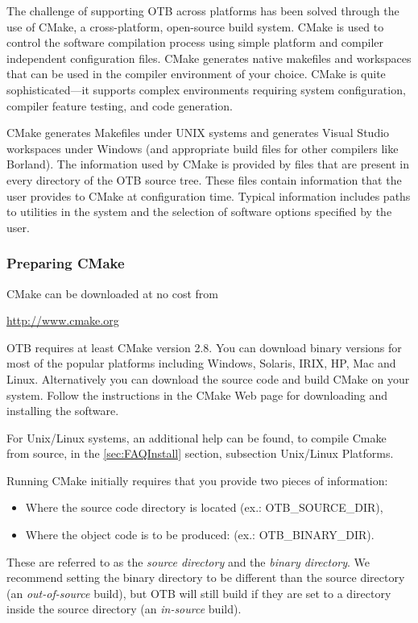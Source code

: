 
The challenge of supporting OTB across platforms has been solved through the
use of CMake, a cross-platform, open-source build system. CMake is used to
control the software compilation process using simple platform and compiler
independent configuration files.  CMake generates native makefiles and
workspaces that can be used in the compiler environment of your choice. CMake
is quite sophisticated---it supports complex environments requiring system
configuration, compiler feature testing, and code generation.

CMake generates Makefiles under UNIX systems and generates Visual
Studio workspaces under Windows (and appropriate build files for other
compilers like Borland). The information used by CMake is provided by
 files that are present in every directory of the OTB
source tree. These files contain information that the user
provides to CMake at configuration time. Typical information includes paths
to utilities in the system and the selection of software options specified by
the user.

\subsubsection{Preparing CMake}
\label{sec:CMakeforOTB}


CMake can be downloaded at no cost from
\begin{center}
  \url{http://www.cmake.org}
\end{center}

OTB requires at least CMake version 2.8. You can download binary
versions for most of the popular platforms including Windows, Solaris,
IRIX, HP, Mac and Linux. Alternatively you can download the source
code and build CMake on your system. Follow the instructions in the
CMake Web page for downloading and installing the software.

For Unix/Linux systems, an additional help can be found, to compile Cmake from source, in the \ref{sec:FAQInstall}
section, subsection Unix/Linux Platforms.

Running CMake initially requires that you provide two pieces of
information:
\begin{itemize}
\item Where the source code directory is located (ex.: OTB\_SOURCE\_DIR),
\item Where the object code is to be produced: (ex.: OTB\_BINARY\_DIR).
\end{itemize}
These are referred to as the \emph{source directory} and the \emph{binary directory}.
We recommend setting the binary directory to be different than the source directory (an
\emph{out-of-source} build), but OTB will still build if they are set
to a directory inside the source directory (an \emph{in-source} build).

